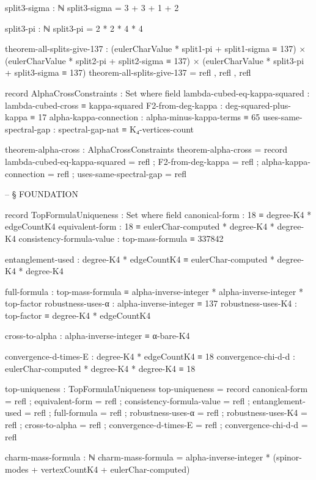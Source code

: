 \documentclass[11pt,a4paper]{book}
\begin{document}
\begin{code}
split3-sigma : ℕ
split3-sigma = 3 + 3 + 1 + 2

split3-pi : ℕ
split3-pi = 2 * 2 * 4 * 4

theorem-all-splits-give-137 : 
  (eulerCharValue * split1-pi + split1-sigma ≡ 137) ×
  (eulerCharValue * split2-pi + split2-sigma ≡ 137) ×
  (eulerCharValue * split3-pi + split3-sigma ≡ 137)
theorem-all-splits-give-137 = refl , refl , refl

record AlphaCrossConstraints : Set where
  field
    lambda-cubed-eq-kappa-squared : lambda-cubed-cross ≡ kappa-squared
    F2-from-deg-kappa            : deg-squared-plus-kappa ≡ 17
    alpha-kappa-connection       : alpha-minus-kappa-terms ≡ 65
    uses-same-spectral-gap       : spectral-gap-nat ≡ K₄-vertices-count

theorem-alpha-cross : AlphaCrossConstraints
theorem-alpha-cross = record
  { lambda-cubed-eq-kappa-squared = refl
  ; F2-from-deg-kappa            = refl
  ; alpha-kappa-connection       = refl
  ; uses-same-spectral-gap       = refl
  }


-- § FOUNDATION

record TopFormulaUniqueness : Set where
  field
    canonical-form : 18 ≡ degree-K4 * edgeCountK4
    equivalent-form : 18 ≡ eulerChar-computed * degree-K4 * degree-K4
    consistency-formula-value : top-mass-formula ≡ 337842
    
    entanglement-used : degree-K4 * edgeCountK4 ≡ eulerChar-computed * degree-K4 * degree-K4
    
    full-formula : top-mass-formula ≡ alpha-inverse-integer * alpha-inverse-integer * top-factor
    robustness-uses-α : alpha-inverse-integer ≡ 137
    robustness-uses-K4 : top-factor ≡ degree-K4 * edgeCountK4
    
    cross-to-alpha : alpha-inverse-integer ≡ α-bare-K4
    
    convergence-d-times-E : degree-K4 * edgeCountK4 ≡ 18
    convergence-chi-d-d : eulerChar-computed * degree-K4 * degree-K4 ≡ 18

top-uniqueness : TopFormulaUniqueness
top-uniqueness = record
  { canonical-form = refl
  ; equivalent-form = refl
  ; consistency-formula-value = refl
  ; entanglement-used = refl
  ; full-formula = refl
  ; robustness-uses-α = refl
  ; robustness-uses-K4 = refl
  ; cross-to-alpha = refl
  ; convergence-d-times-E = refl
  ; convergence-chi-d-d = refl
  }

charm-mass-formula : ℕ
charm-mass-formula = alpha-inverse-integer * (spinor-modes + vertexCountK4 + eulerChar-computed)


\end{code}
\end{document}
